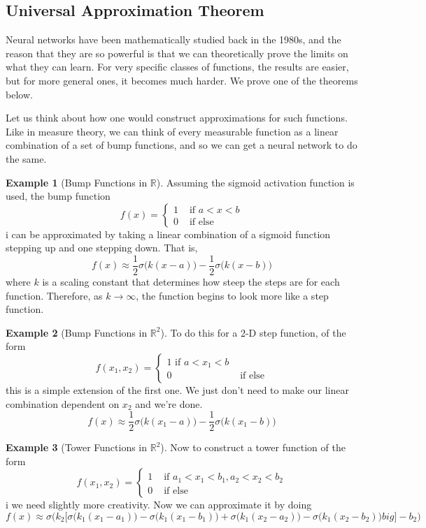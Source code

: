 \documentclass{article}
\theoremstyle{definition}
\newtheorem{example}{Example}[section]
\theoremstyle{remark}
\theoremstyle{definition}
\begin{document}
\subsection{Universal Approximation Theorem} 

Neural networks have been mathematically studied back in the 1980s, and the reason that they are so powerful is that we can theoretically prove the limits on what they can learn. For very specific classes of functions, the results are easier, but for more general ones, it becomes much harder. We prove one of the theorems below. 

Let us think about how one would construct approximations for such functions. Like in measure theory, we can think of every measurable function as a linear combination of a set of bump functions, and so we can get a neural network to do the same.

\begin{example}[Bump Functions in $\mathbb{R}$] 
Assuming the sigmoid activation function is used, the bump function 
\[f(x) = \begin{cases} 1 & \text{ if } a < x < b \\ 0 & \text{ if else} \end{cases}\]i
can be approximated by taking a linear combination of a sigmoid function stepping up and one stepping down. That is, 
\[f(x) \approx \frac{1}{2} \sigma \big( k( x - a)\big) - \frac{1}{2} \sigma \big( k (x - b) \big)\]
where $k$ is a scaling constant that determines how steep the steps are for each function. Therefore, as $k \rightarrow \infty$, the function begins to look more like a step function. 
\end{example}

\begin{example}[Bump Functions in $\mathbb{R}^2$]
To do this for a 2-D step function, of the form 
\[f(x_1, x_2) = \begin{cases} 1 \text{ if } a < x_1 < b \\ 0 & \text{ if else} \end{cases}\]
this is a simple extension of the first one. We just don't need to make our linear combination dependent on $x_2$ and we're done.
\[f(x) \approx \frac{1}{2} \sigma \big( k( x_1 - a)\big) - \frac{1}{2} \sigma \big( k (x_1 - b) \big)\]

\end{example} 

\begin{example}[Tower Functions in $\mathbb{R}^2$] 
Now to construct a tower function of the form 
\[f(x_1, x_2) = \begin{cases} 1 & \text{ if } a_1 < x_1 < b_1, a_2 < x_2 < b_2 \\ 0 & \text{ if else} \end{cases}\]i
we need slightly more creativity. Now we can approximate it by doing 
\[f(x) \approx \sigma \bigg( k_2 \big[ \sigma\big( k_1 (x_1 - a_1)\big) - \sigma\big( k_1 (x_1 -b_1)\big) + \sigma \big( k_1 (x_2 - a_2)\big) - \sigma\big(k_1 (x_2 - b_2)\big)  big] - b_2\bigg)\]
\end{example} 
\end{document}
